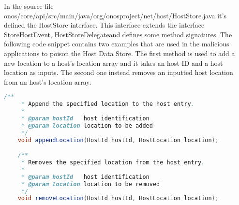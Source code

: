 \documentclass[a4paper,10pt]{memoir}
\begin{document}
In the source file onos/core/api/src/main/java/org/onosproject/net/host/HostStore.java it's defined the HostStore interface. This interface extends the interface Store\textlangle HostEvent, HostStoreDelegate\textrangle and defines some method signatures. The following code snippet contains two examples that are used in the malicious applications to poison the Host Data Store. The first method is used to add a new location to a host's location array and it takes an host ID and a host location as inputs. The second one instead removes an inputted host location from an host's location array.
\begin{lstlisting}[language=java,firstnumber=102]
    /**
     * Append the specified location to the host entry.
     *
     * @param hostId   host identification
     * @param location location to be added
     */
    void appendLocation(HostId hostId, HostLocation location);

    /**
     * Removes the specified location from the host entry.
     *
     * @param hostId   host identification
     * @param location location to be removed
     */
    void removeLocation(HostId hostId, HostLocation location);
\end{lstlisting}
\end{document}
